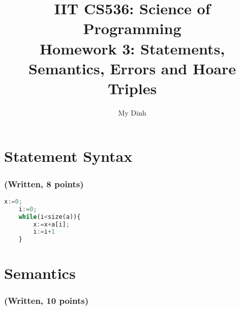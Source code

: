 \documentclass{article}
\title{IIT CS536: Science of Programming\\
  {\large Homework 3: Statements, Semantics, Errors and Hoare Triples}}
\author{My Dinh}
\date{}
\begin{document}
\maketitle

\section{Statement Syntax}

\subsubsection{(Written, 8 points)}

\begin{center}
    \begin{lstlisting}[language=Python]
    x:=0;
    i:=0;
    while(i<size(a)){
        x:=x+a[i];
        i:=i+1
    }
    \end{lstlisting}
\end{center}

\section{Semantics}

\subsubsection{(Written, 10 points)}
\end{document}

